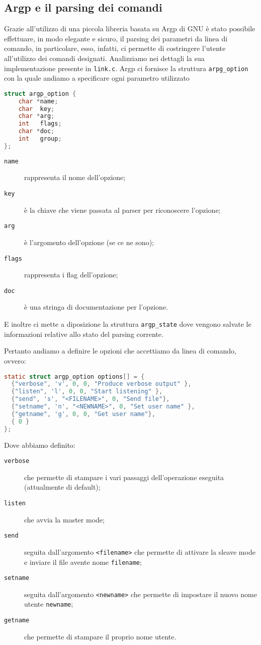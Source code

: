 \documentclass[11pt,fleqn]{book} %
\begin{document}
\subsection{Argp e il parsing dei comandi}
Grazie all'utilizzo di una piccola libreria basata su Argp di GNU  è stato possibile effettuare, in modo elegante e sicuro, il parsing dei parametri da linea di comando, in particolare, esso, infatti, ci permette di costringere l'utente all'utilizzo dei comandi designati. Analizziamo nei dettagli la sua implementazione presente in \texttt{link.c}.
Argp ci fornisce la struttura \texttt{arpg\_option} con la quale andiamo a specificare ogni parametro utilizzato
\begin{lstlisting}[language=C]
struct argp_option {
    char *name;
    char  key;
    char *arg;
    int   flags;
    char *doc;
    int   group;    
};
\end{lstlisting}
\begin{description}
	\item [\texttt{name}] rappresenta il nome dell'opzione;
	\item [\texttt{key}] è la chiave che viene passata al parser per riconoscere l'opzione;
	\item [\texttt{arg}] è l'argomento dell'opzione (se ce ne sono);
	\item [\texttt{flags}] rappresenta i flag dell'opzione;
	\item [\texttt{doc}] è una stringa di documentazione per l'opzione.
\end{description}

E inoltre ci mette a diposizione la struttura \texttt{argp\_state} dove vengono salvate le informazioni relative allo stato del parsing corrente.

Pertanto andiamo a definire le opzioni che accettiamo da linea di comando, ovvero:
\begin{lstlisting}[language=C]
	static struct argp_option options[] = {
  {"verbose", 'v', 0, 0, "Produce verbose output" },
  {"listen", 'l', 0, 0, "Start listening" },
  {"send", 's', "<FILENAME>", 0, "Send file"},
  {"setname", 'n', "<NEWNAME>", 0, "Set user name" },
  {"getname", 'g', 0, 0, "Get user name"},
  { 0 }
};
\end{lstlisting}
Dove abbiamo definito:
\begin{description}
	\item [\texttt{verbose}] che permette di stampare i vari passaggi dell'operazione eseguita (attualmente di default);
	\item [\texttt{listen}] che avvia la master mode;
	\item [\texttt{send}]  seguita dall'argomento \texttt{<filename>} che permette di attivare la sleave mode e inviare il file avente nome 					\texttt{filename};
	\item [\texttt{setname}] seguita dall'argomento \texttt{<newname>} che permette di impostare il nuovo nome utente \texttt{newname};
	\item [\texttt{getname}] che permette di stampare il proprio nome utente.
\end{description}
\end{document}
